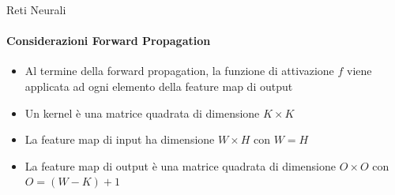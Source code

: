 \documentclass[
 ]{beamer}
\begin{document}

\begin{frame}{Reti Neurali}
    \framesubtitle{Considerazioni Forward Propagation} 
    
    \begin{itemize} [<+->]
        \setlength\itemsep{3em}
        \item \large Al termine della forward propagation, la funzione di attivazione $f$ viene applicata ad ogni elemento della feature map di output
        \item \large Un kernel è una matrice quadrata di dimensione $K \times K$
        \item \large La feature map di input ha dimensione $W \times H$ con $W = H$ 
        \item \large La feature map di output è una matrice quadrata di dimensione $O \times O$ con $O = (W - K) + 1$
    \end{itemize}
\end{frame}
\end{document}
